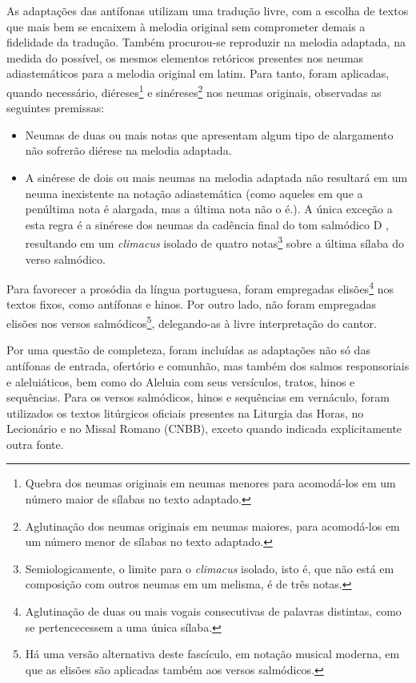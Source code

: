As adaptações das antífonas utilizam uma tradução livre, com a escolha de textos que mais bem se encaixem à melodia original sem comprometer demais a fidelidade da tradução. Também procurou-se reproduzir na melodia adaptada, na medida do possível, os mesmos elementos retóricos presentes nos neumas adiastemáticos para a melodia original em latim. Para tanto, foram aplicadas, quando necessário, diéreses\footnote{Quebra dos neumas originais em neumas menores para acomodá-los em um número maior de sílabas no texto adaptado.} e sinéreses\footnote{Aglutinação dos neumas originais em neumas maiores, para acomodá-los em um número menor de sílabas no texto adaptado.} nos neumas originais, observadas as seguintes premissas:
\begin{itemize}
  \item Neumas de duas ou mais notas que apresentam algum tipo de alargamento não sofrerão diérese na melodia adaptada.
  \item A sinérese de dois ou mais neumas na melodia adaptada não resultará em um neuma inexistente na notação adiastemática (como aqueles em que a penúltima nota é alargada, mas a última nota não o é.). A única exceção a esta regra é a sinérese dos neumas da cadência final do tom salmódico D \GreStar, resultando em um \emph{climacus} isolado de quatro notas\footnote{Semiologicamente, o limite para o \emph{climacus} isolado, isto é, que não está em composição com outros neumas em um melisma, é de três notas.} sobre a última sílaba do verso salmódico.
\end{itemize}

Para favorecer a prosódia da língua portuguesa, foram empregadas elisões\footnote{Aglutinação de duas ou mais vogais consecutivas de palavras distintas, como se pertencecessem a uma única sílaba.} nos textos fixos, como antífonas e hinos. Por outro lado, não foram empregadas elisões nos versos salmódicos\footnote{Há uma versão alternativa deste fascículo, em notação musical moderna, em que as elisões são aplicadas também aos versos salmódicos.}, delegando-as à livre interpretação do cantor.

Por uma questão de completeza, foram incluídas as adaptações não só das antífonas de entrada, ofertório e comunhão, mas também dos salmos responsoriais e aleluiáticos, bem como do Aleluia com seus versículos, tratos, hinos e sequências. Para os versos salmódicos, hinos e sequências em vernáculo, foram utilizados os textos litúrgicos oficiais presentes na Liturgia das Horas, no Lecionário e no Missal Romano (CNBB), exceto quando indicada explicitamente outra fonte.

